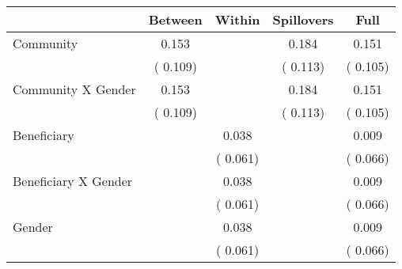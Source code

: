 
\begin{tabular}{l*{4}{c}}\hline&\multicolumn{1}{c}{Between}&\multicolumn{1}{c}{Within}&\multicolumn{1}{c}{Spillovers}&\multicolumn{1}{c}{Full}\\ \hline
 Community                                     &              0.153      &                                               &        0.184 &         0.151                            \\ 
                                                       &        (       0.109)           &                                       &       (       0.113)     &      (       0.105)                                           \\ 
 Community X Gender            &              0.153      &                                               &        0.184 &         0.151                            \\ 
                                                       &        (       0.109)           &                                       &       (       0.113)     &      (       0.105)                                           \\ 
 Beneficiary                           &                                               &        0.038    &                                &             0.009                            \\ 
                                                       &                                               & (       0.061)                  &                                        &      (       0.066)                                           \\ 
 Beneficiary X Gender          &                                               &        0.038    &                                &             0.009                            \\ 
                                                       &                                               & (       0.061)                  &                                        &      (       0.066)                                           \\ 
 Gender                                        &                              &        0.038    &                                &             0.009                            \\ 
                                                       &                                               & (       0.061)                  &                                        &      (       0.066)                                           \\ 

\end{tabular}
